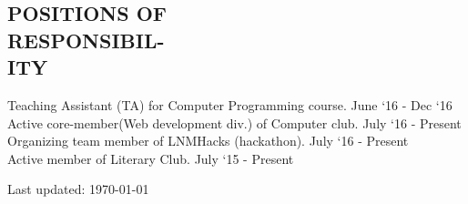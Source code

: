 \documentclass[margin]{res}
\begin{document}
\begin{resume}
\section{POSITIONS OF\\ RESPONSIBIL-\\ITY}
    Teaching Assistant (TA) for Computer Programming course. \hfill June `16 - Dec `16\\
    Active core-member(Web development div.) of Computer club. \hfill July `16 - Present\\
    Organizing team member of LNMHacks (hackathon). \hfill July `16 - Present\\
	Active member of Literary Club. \hfill July `15 - Present\\


\begin{center}
  \begin{footnotesize}
    Last updated: \today \\
  \end{footnotesize}
\end{center}

\end{resume}
\end{document}
